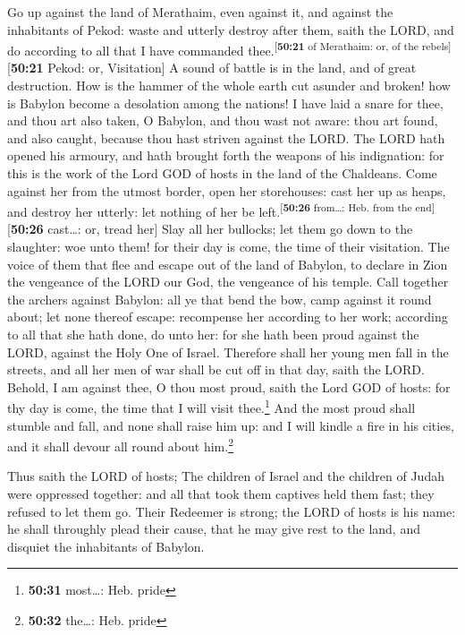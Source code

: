  Go up against the land of Merathaim, even against it,
and against the inhabitants of Pekod: waste and utterly destroy after
them, saith the LORD, and do according to all that I have commanded
thee.\textsuperscript{{[}\textbf{50:21} of Merathaim: or, of the
rebels{]}}{[}\textbf{50:21} Pekod: or, Visitation{]}  A
sound of battle is in the land, and of great destruction.
 How is the hammer of the whole earth cut asunder and
broken! how is Babylon become a desolation among the nations!
 I have laid a snare for thee, and thou art also taken, O
Babylon, and thou wast not aware: thou art found, and also caught,
because thou hast striven against the LORD.  The LORD
hath opened his armoury, and hath brought forth the weapons of his
indignation: for this is the work of the Lord GOD of hosts in the land
of the Chaldeans.  Come against her from the utmost
border, open her storehouses: cast her up as heaps, and destroy her
utterly: let nothing of her be left.\textsuperscript{{[}\textbf{50:26}
from\ldots: Heb. from the end{]}}{[}\textbf{50:26} cast\ldots: or, tread
her{]}  Slay all her bullocks; let them go down to the
slaughter: woe unto them! for their day is come, the time of their
visitation.  The voice of them that flee and escape out
of the land of Babylon, to declare in Zion the vengeance of the LORD our
God, the vengeance of his temple.  Call together the
archers against Babylon: all ye that bend the bow, camp against it round
about; let none thereof escape: recompense her according to her work;
according to all that she hath done, do unto her: for she hath been
proud against the LORD, against the Holy One of Israel. 
Therefore shall her young men fall in the streets, and all her men of
war shall be cut off in that day, saith the LORD. 
Behold, I am against thee, O thou most proud, saith the Lord GOD of
hosts: for thy day is come, the time that I will visit thee.\footnote{\textbf{50:31}
  most\ldots: Heb. pride}  And the most proud shall
stumble and fall, and none shall raise him up: and I will kindle a fire
in his cities, and it shall devour all round about him.\footnote{\textbf{50:32}
  the\ldots: Heb. pride}

 Thus saith the LORD of hosts; The children of Israel and
the children of Judah were oppressed together: and all that took them
captives held them fast; they refused to let them go. 
Their Redeemer is strong; the LORD of hosts is his name: he shall
throughly plead their cause, that he may give rest to the land, and
disquiet the inhabitants of Babylon.

